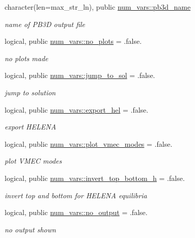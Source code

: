 \begin{DoxyCompactItemize}
character(len=max\+\_\+str\+\_\+ln), public \hyperlink{namespacenum__vars_a8b3ab3b12cddc0c3e60c3430912b5f3c}{num\+\_\+vars\+::pb3d\+\_\+name}
\begin{DoxyCompactList}\small\item\em name of P\+B3D output file \end{DoxyCompactList}\item 
logical, public \hyperlink{namespacenum__vars_afe223f0c9580de8bf52d2cedc2ab2ee8}{num\+\_\+vars\+::no\+\_\+plots} = .false.
\begin{DoxyCompactList}\small\item\em no plots made \end{DoxyCompactList}\item 
logical, public \hyperlink{namespacenum__vars_acd9fb4b84728c986d5ecde709dcac940}{num\+\_\+vars\+::jump\+\_\+to\+\_\+sol} = .false.
\begin{DoxyCompactList}\small\item\em jump to solution \end{DoxyCompactList}\item 
logical, public \hyperlink{namespacenum__vars_aa1342b6b43268bd10bb254fa9bf754f0}{num\+\_\+vars\+::export\+\_\+hel} = .false.
\begin{DoxyCompactList}\small\item\em export H\+E\+L\+E\+NA \end{DoxyCompactList}\item 
logical, public \hyperlink{namespacenum__vars_a89067eb4dc3fcdcc85d7cf185d3774ea}{num\+\_\+vars\+::plot\+\_\+vmec\+\_\+modes} = .false.
\begin{DoxyCompactList}\small\item\em plot V\+M\+EC modes \end{DoxyCompactList}\item 
logical, public \hyperlink{namespacenum__vars_a9c579c39602d4a4761335866603aea5f}{num\+\_\+vars\+::invert\+\_\+top\+\_\+bottom\+\_\+h} = .false.
\begin{DoxyCompactList}\small\item\em invert top and bottom for H\+E\+L\+E\+NA equilibria \end{DoxyCompactList}\item 
logical, public \hyperlink{namespacenum__vars_a324342d6240045750e38ef545801c49d}{num\+\_\+vars\+::no\+\_\+output} = .false.
\begin{DoxyCompactList}\small\item\em no output shown \end{DoxyCompactList}\item 

\end{DoxyCompactItemize}
